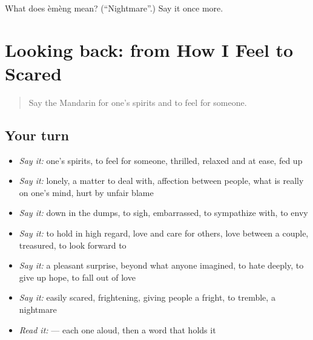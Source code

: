 \begin{tcolorbox}[breakable,colback=teal!4,colframe=teal!35!black,title={Before you move on}]
What does èmèng mean? (\textquotedblleft{}Nightmare\textquotedblright{}.) Say it once more.
\end{tcolorbox}
\section[(dialogue)]{Looking back: from How I Feel to Scared}

\label{lesson:ZH-R463-review-458-463}



\begin{quote}
Say the Mandarin for one's spirits and to feel for someone.
\end{quote}

\subsection*{Your turn}
\begin{itemize}
\raggedright
  \item \emph{Say it:} one's spirits, to feel for someone, thrilled, relaxed and at ease, fed up
  \item \emph{Say it:} lonely, a matter to deal with, affection between people, what is really on one's mind, hurt by unfair blame
  \item \emph{Say it:} down in the dumps, to sigh, embarrassed, to sympathize with, to envy
  \item \emph{Say it:} to hold in high regard, love and care for others, love between a couple, treasured, to look forward to
  \item \emph{Say it:} a pleasant surprise, beyond what anyone imagined, to hate deeply, to give up hope, to fall out of love
  \item \emph{Say it:} easily scared, frightening, giving people a fright, to tremble, a nightmare
  \item \emph{Read it:}    — each one aloud, then a word that holds it
\end{itemize}

